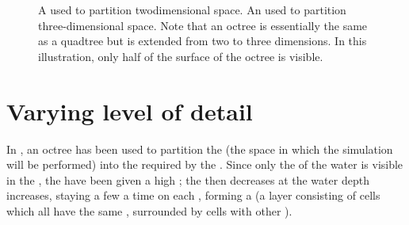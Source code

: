 \begin{figure}
{
    }
    \caption{ A \quadtree used to partition twodimensional space.  An \octree used to partition three-dimensional space. Note that an octree is essentially the same as a quadtree but is extended from two to three dimensions. In this illustration, only half of the surface of the octree is visible.}
    \label{fig:quadtree_and_octree}
\end{figure}


\section{Varying level of detail}

In \thisprojectwork, an octree has been used to partition the  (the space in which the simulation will be performed) into the \cells required by the \FVM. Since only the \surface of the water is visible in the \simulation, the  have been given a high \LOD; the \LOD then decreases at the water depth increases, staying a few  a time on each \LOD, forming a  (a layer consisting of cells which all have the same \LOD, surrounded by cells with other \LODs).

